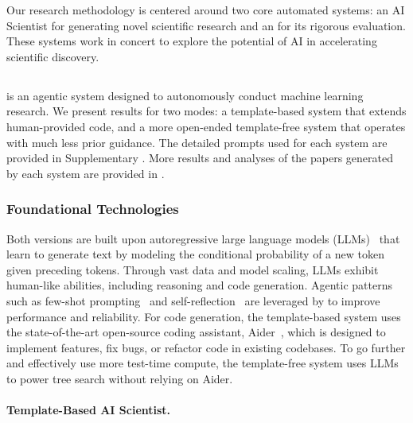 %

Our research methodology is centered around two core automated systems: an AI Scientist for generating novel scientific research and an \ourreviewer for its rigorous evaluation. These systems work in concert to explore the potential of AI in accelerating scientific discovery.

\subsection*{\ouralgo}
\ouralgo is an agentic system designed to autonomously conduct machine learning research. We present results for two modes: a template-based system that extends human-provided code, and a more open-ended template-free system that operates with much less prior guidance.
The detailed prompts used for each system are provided in Supplementary . More results and analyses of the papers generated by each system are provided in .

\subsubsection*{Foundational Technologies}
Both versions are built upon autoregressive large language models (LLMs)~\citep{gpt4, claude3, llama3} that learn to generate text by modeling the conditional probability of a new token given preceding tokens. Through vast data and model scaling, LLMs exhibit human-like abilities, including reasoning and code generation. Agentic patterns~\citep{llm_agent_survey} such as few-shot prompting~\citep{brown2020language}
and self-reflection~\citep{shinn2024reflexion} are leveraged by \ouralgo to improve performance and reliability.
For code generation, the template-based system uses the state-of-the-art open-source coding assistant, Aider~\citep{aider}, which is designed to implement features, fix bugs, or refactor code in existing codebases.
To go further and effectively use more test-time compute, the template-free system uses LLMs to power tree search without relying on Aider.

\paragraph{Template-Based AI Scientist.}
\label{subsec:template-method}

